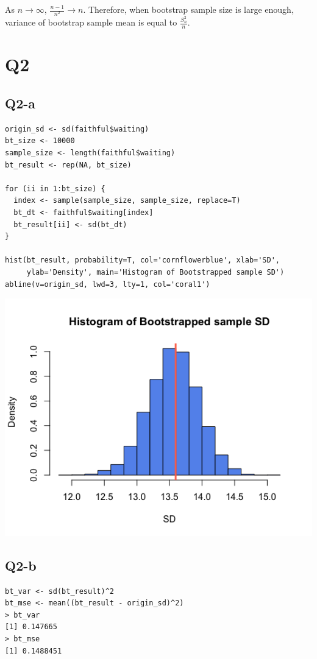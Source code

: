 \documentclass[12pt,letterpaper]{article}
\begin{document}
\noindent As $n \rightarrow \infty$, $\frac{n - 1}{n^2} \rightarrow n$. Therefore, when bootstrap sample size is large enough, variance of bootstrap sample mean is equal to $\frac{S_n^2}{n}$.

\newpage
\section*{Q2}
\subsection*{Q2-a}
\begin{verbatim}
origin_sd <- sd(faithful$waiting)
bt_size <- 10000
sample_size <- length(faithful$waiting)
bt_result <- rep(NA, bt_size)

for (ii in 1:bt_size) {
  index <- sample(sample_size, sample_size, replace=T)
  bt_dt <- faithful$waiting[index]
  bt_result[ii] <- sd(bt_dt)
}

hist(bt_result, probability=T, col='cornflowerblue', xlab='SD',
     ylab='Density', main='Histogram of Bootstrapped sample SD')
abline(v=origin_sd, lwd=3, lty=1, col='coral1')
\end{verbatim}

\includegraphics[width=150mm]{hist_bt_sd.png}

\subsection*{Q2-b}
\begin{verbatim}
bt_var <- sd(bt_result)^2
bt_mse <- mean((bt_result - origin_sd)^2)
> bt_var
[1] 0.147665
> bt_mse
[1] 0.1488451
\end{verbatim}
\end{document}
